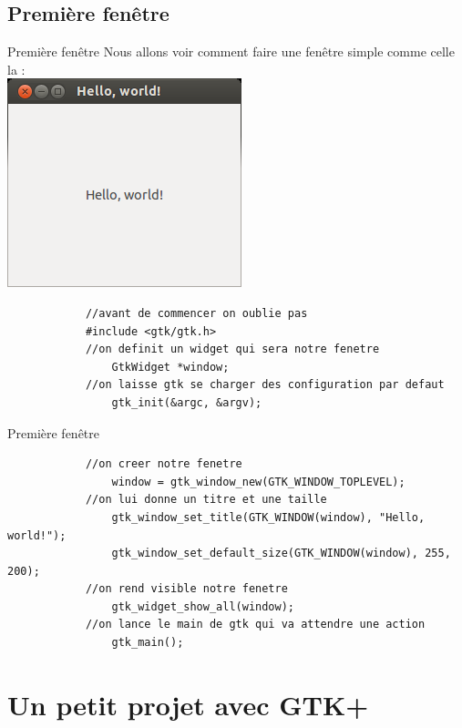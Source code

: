 \documentclass{beamer}
\begin{document}
	\subsection{Première fenêtre}
	\begin{frame}[containsverbatim]{Première fenêtre}
		Nous allons voir comment faire une fenêtre simple comme celle la :\\
		\centering
		\includegraphics[scale=0.35]{"hello"}\\
		\begin{lstlisting}
			//avant de commencer on oublie pas
			#include <gtk/gtk.h>
			//on definit un widget qui sera notre fenetre
				GtkWidget *window;
			//on laisse gtk se charger des configuration par defaut
				gtk_init(&argc, &argv);
		\end{lstlisting}
	\end{frame}
	\begin{frame}[containsverbatim]{Première fenêtre}
		\begin{lstlisting}
			//on creer notre fenetre
				window = gtk_window_new(GTK_WINDOW_TOPLEVEL);
			//on lui donne un titre et une taille
				gtk_window_set_title(GTK_WINDOW(window), "Hello, world!");
				gtk_window_set_default_size(GTK_WINDOW(window), 255, 200);
			//on rend visible notre fenetre
				gtk_widget_show_all(window);
			//on lance le main de gtk qui va attendre une action
				gtk_main();
		\end{lstlisting}
	\end{frame}

	\section{Un petit projet avec GTK+}
\end{document}
